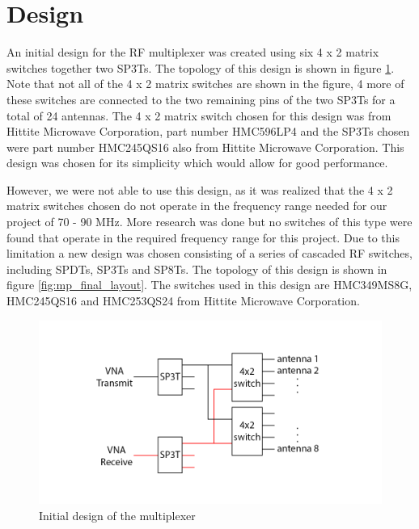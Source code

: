 \section{Design}

An initial design for the RF multiplexer was created using six 4 x 2 matrix switches together two SP3Ts. The topology of this design is shown in figure \ref{fig:mp_initial_layout}. Note that not all of the 4 x 2 matrix switches are shown in the figure, 4 more of these switches are connected to the two remaining pins of the two SP3Ts for a total of 24 antennas. The 4 x 2 matrix switch chosen for this design was from Hittite Microwave Corporation, part number HMC596LP4 and the SP3Ts chosen were part number HMC245QS16 also from Hittite Microwave Corporation.  This design was chosen for its simplicity which would allow for good performance.

However, we were not able to use this design, as it was realized that the 4 x 2 matrix switches chosen do not operate in the frequency range needed for our project of 70 - 90 MHz. More research was done but no switches of this type were found that operate in the required frequency range for this project. Due to this limitation a new design was chosen consisting of a series of cascaded RF switches, including SPDTs, SP3Ts and SP8Ts. The topology of this design is shown in figure \ref{fig:mp_final_layout}. The switches used in this design are HMC349MS8G, HMC245QS16 and HMC253QS24 from Hittite Microwave Corporation.


\begin{figure}[h]
	\begin{center}
		\includegraphics[width=5in]{./images/mp_initial_layout.png}
		\caption{Initial design of the multiplexer}
		\label{fig:mp_initial_layout}
	\end{center}
\end{figure}

